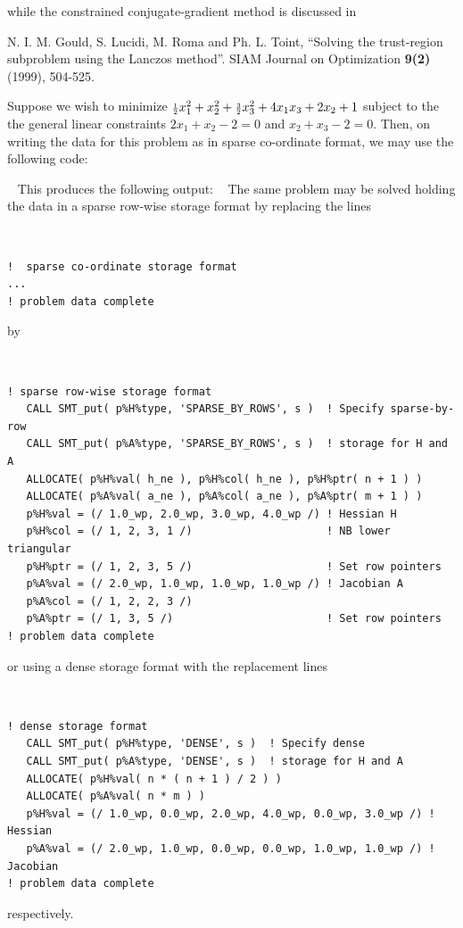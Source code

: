 \documentclass{galahad}
\begin{document}
\noindent
while the constrained conjugate-gradient method is discussed in
\vspace*{1mm}

\noindent  
N. I. M. Gould, S. Lucidi, M. Roma and Ph. L. Toint, 
``Solving the trust-region subproblem using the Lanczos method''. 
SIAM Journal on Optimization {\bf 9(2)} (1999), 504-525. 


\galexample
Suppose we wish to minimize
${\scriptstyle \frac{1}{2}} x_1^2 + x_2^2 + {\scriptstyle \frac{3}{2}} x_3^2 + 4 x_1 x_3 + 2 x_2 + 1$
subject to the the general linear constraints
$2 x_{1}  +  x_{2} - 2 = 0$ and
$x_{2} +  x_{3}  - 2 = 0$.
Then, on writing the data for this problem as
in sparse co-ordinate format,
we may use the following code:

{\tt \small
\VerbatimInput{\packageexample}
}
\noindent
This produces the following output:
{\tt \small
\VerbatimInput{\packageresults}
}
\noindent
The same problem may be solved holding the data in 
a sparse row-wise storage format by replacing the lines
{\tt \small
\begin{verbatim}
!  sparse co-ordinate storage format
...
! problem data complete   
\end{verbatim}
}
\noindent
by
{\tt \small
\begin{verbatim}
! sparse row-wise storage format
   CALL SMT_put( p%H%type, 'SPARSE_BY_ROWS', s )  ! Specify sparse-by-row
   CALL SMT_put( p%A%type, 'SPARSE_BY_ROWS', s )  ! storage for H and A
   ALLOCATE( p%H%val( h_ne ), p%H%col( h_ne ), p%H%ptr( n + 1 ) )
   ALLOCATE( p%A%val( a_ne ), p%A%col( a_ne ), p%A%ptr( m + 1 ) )
   p%H%val = (/ 1.0_wp, 2.0_wp, 3.0_wp, 4.0_wp /) ! Hessian H
   p%H%col = (/ 1, 2, 3, 1 /)                     ! NB lower triangular
   p%H%ptr = (/ 1, 2, 3, 5 /)                     ! Set row pointers
   p%A%val = (/ 2.0_wp, 1.0_wp, 1.0_wp, 1.0_wp /) ! Jacobian A
   p%A%col = (/ 1, 2, 2, 3 /)
   p%A%ptr = (/ 1, 3, 5 /)                        ! Set row pointers  
! problem data complete   
\end{verbatim}
}
\noindent
or using a dense storage format with the replacement lines
{\tt \small
\begin{verbatim}
! dense storage format
   CALL SMT_put( p%H%type, 'DENSE', s )  ! Specify dense
   CALL SMT_put( p%A%type, 'DENSE', s )  ! storage for H and A
   ALLOCATE( p%H%val( n * ( n + 1 ) / 2 ) )
   ALLOCATE( p%A%val( n * m ) )
   p%H%val = (/ 1.0_wp, 0.0_wp, 2.0_wp, 4.0_wp, 0.0_wp, 3.0_wp /) ! Hessian
   p%A%val = (/ 2.0_wp, 1.0_wp, 0.0_wp, 0.0_wp, 1.0_wp, 1.0_wp /) ! Jacobian
! problem data complete   
\end{verbatim}
}
\noindent
respectively.
\end{document}
